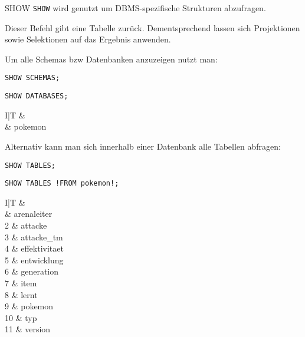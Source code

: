 \begin{sql}{SHOW}
    \texttt{SHOW} wird genutzt um DBMS-spezifische Strukturen abzufragen.

    Dieser Befehl gibt eine Tabelle zurück.
    Dementsprechend lassen sich Projektionen sowie Selektionen auf das Ergebnis anwenden.

    Um alle Schemas bzw Datenbanken anzuzeigen nutzt man:

    \begin{lstlisting}[language=mysql]
        SHOW SCHEMAS;
    \end{lstlisting}

    \begin{lstlisting}[language=mysql]
        SHOW DATABASES;
    \end{lstlisting}

    \setcounter{rownum}{0}
    \begin{tabular}{I|T}
          &  \\ & pokemon                      \\
    \end{tabular}
    \vspace{1em}

    Alternativ kann man sich innerhalb einer Datenbank alle Tabellen abfragen:

    \begin{lstlisting}[language=mysql]
        SHOW TABLES;
    \end{lstlisting}

    \begin{lstlisting}[language=mysql]
        SHOW TABLES !FROM pokemon!;
    \end{lstlisting}

    \setcounter{rownum}{0}
    \begin{tabular}{I|T}
           &  \\  & arenaleiter                             \\
        2  & attacke                                 \\
        3  & attacke\_tm                             \\
        4  & effektivitaet                           \\
        5  & entwicklung                             \\
        6  & generation                              \\
        7  & item                                    \\
        8  & lernt                                   \\
        9  & pokemon                                 \\
        10 & typ                                     \\
        11 & version                                 \\
    \end{tabular}
    \vspace{1em}


\end{sql}
